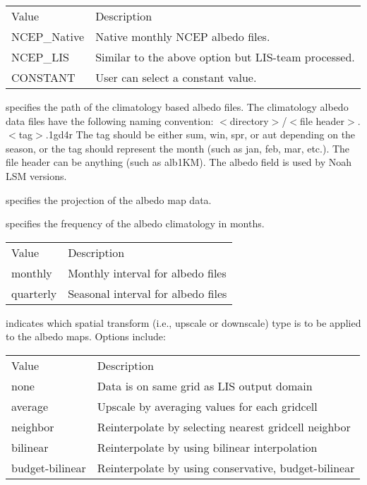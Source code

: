  \begin{tabular}{ll}
 Value         & Description    \\
 NCEP\_Native  &  Native monthly NCEP albedo files. \\
 NCEP\_LIS     &  Similar to the above option but LIS-team processed. \\
 CONSTANT      &  User can select a constant value. \\
 \end{tabular}

  specifies the path of the climatology based
 albedo files.  The climatology albedo data files have the following
 naming convention: $<$directory$>$/$<$file header$>$.$<$tag$>$.1gd4r
 The tag should be either sum, win, spr, or aut depending on the season,
 or the tag should represent the month (such as jan, feb, mar, etc.).
 The file header can be anything (such as alb1KM).
  The albedo field is used by Noah LSM versions.

  specifies the projection of the
 albedo map data.

  specifies the frequency of the
 albedo climatology in months.

 \begin{tabular}{ll}
 Value     & Description                        \\
 monthly   & Monthly interval for albedo files  \\
 quarterly & Seasonal interval for albedo files \\
 \end{tabular}

  indicates which spatial transform
 (i.e., upscale or downscale) type is to be applied to the albedo
 maps.  Options include:

 \begin{tabular}{ll}
 Value           & Description                                          \\
 none            & Data is on same grid as LIS output domain            \\
 average         & Upscale by averaging values for each gridcell        \\
 neighbor        & Reinterpolate by selecting nearest gridcell neighbor \\
 bilinear        & Reinterpolate by using bilinear interpolation        \\
 budget-bilinear & Reinterpolate by using conservative, budget-bilinear \\
 \end{tabular}
 

